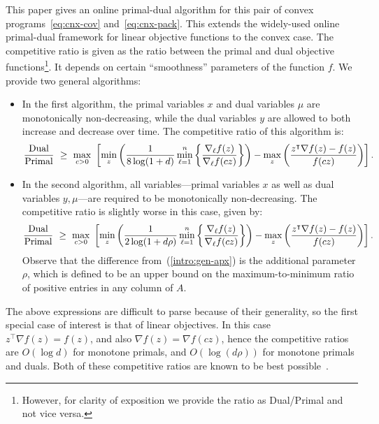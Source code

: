 \documentclass[letterpaper,11pt]{article}
\newcommand{\trans}{\intercal}
\begin{document}
This paper gives an online primal-dual algorithm for this pair of convex
programs~\eqref{eq:cnx-cov} and~\eqref{eq:cnx-pack}. This extends the
widely-used online primal-dual framework for linear objective functions to the
convex case. The competitive ratio is given as the ratio between the primal and dual objective functions\footnote{However, for clarity of exposition we provide the ratio as
Dual/Primal and not vice versa.}. It depends on certain
``smoothness'' parameters of the function $f$. We provide two general
algorithms:
\begin{itemize}
\item In the first algorithm, the primal variables $x$ and dual variables $\mu$ are monotonically non-decreasing, while the dual variables $y$ are allowed to both increase and decrease over time. The competitive ratio of this algorithm is:
  \begin{equation}\label{intro:gen-apx}
    \frac{{\rm Dual}}{{\rm Primal}}\,\,\ge \,\, \max_{c > 0} \,\,
    \left[\min_{z} \left( \frac{1}{8\log (1+d ) }\min_{\ell=1}^{n}\left\{\frac{\nabla_\ell
          f(z)}{\nabla_\ell f(cz)}\right\}\right) -
    \max_{z} \left(\frac{z^\trans \nabla f(z) -
        f(z) }{f(c z)}\right)\right].
  \end{equation}



\item In the second algorithm, all variables---primal variables $x$
  as well as dual variables $y,\mu$---are required to be monotonically non-decreasing. The
  competitive ratio is slightly worse in this case, given by:
  \begin{equation}\label{intro:gen-apx-mon}
    \frac{{\rm Dual}}{{\rm Primal}}\,\,\ge \,\, \max_{c > 0} \,\,
    \left[\min_{z} \left( \frac{1}{2 \log (1+d\rho)}\min_{\ell=1}^{n}\left\{\frac{\nabla_\ell
          f(z)}{\nabla_\ell f(cz)}\right\}\right) -
    \max_{z} \left(\frac{z^\trans \nabla f(z) -
        f(z) }{f(c z)}\right)\right].
  \end{equation}
  Observe that the difference from~(\ref{intro:gen-apx}) is the additional
  parameter $\rho$, which is defined to be an upper bound on the maximum-to-minimum ratio of positive
  entries in any column of $A$.
\end{itemize}
The above expressions are difficult to parse because of their generality, so
the first special case of interest is that of linear objectives. In this
case $z^\trans \nabla f(z) = f(z)$, and also $\nabla f(z) = \nabla
f(cz)$, hence the competitive ratios are $O(\log d)$ for monotone
primals, and $O(\log (d\rho))$ for monotone primals and duals. Both of
these competitive ratios are known to be best
possible~\cite{BN-MOR,GN12-mor}.
\end{document}

